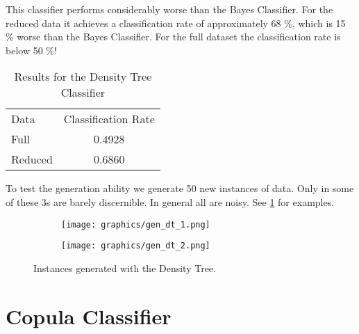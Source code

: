 \documentclass{article}
\begin{document}
This classifier performs considerably worse than the Bayes Classifier. For the reduced data it achieves a 
classification rate of approximately 68 \%, which is 15 \% worse than the Bayes Classifier. 
For the full dataset the classification rate is below 50 \%!

\begin{table}[h]
	\centering
	\begin{tabular}{l c}
		Data	&	Classification Rate	\\
		Full	&	0.4928				\\
	 	Reduced & 	0.6860				\\
	\end{tabular}
	\caption{Results for the Density Tree Classifier}
	\label{tab2}
\end{table}

To test the generation ability we generate 50 new instances of data.
Only in some of these 3s are barely discernible. In general all are noisy.
See \ref{fig2} for examples.

\begin{figure}[h]
	\centering
	\begin{subfigure}[b]{0.4\textwidth}
		\texttt{[image: graphics/gen\_dt\_1.png]}
	\end{subfigure}
	\begin{subfigure}[b]{0.4\textwidth}
		\texttt{[image: graphics/gen\_dt\_2.png]}
	\end{subfigure}
	\caption{Instances generated with the Density Tree.}
	\label{fig2}
\end{figure}

\section{Copula Classifier}
\end{document}

